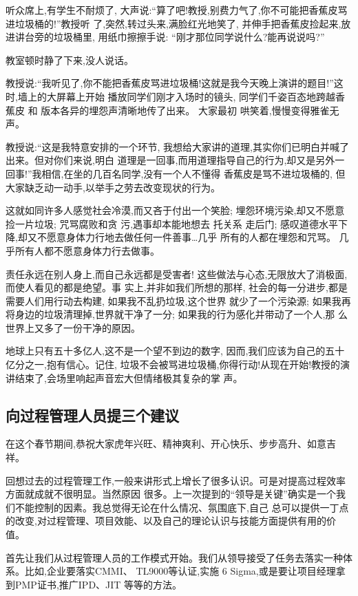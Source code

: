 \documentclass[11pt]{article}
\begin{document}
听众席上,有学生不耐烦了, 大声说:``算了吧!教授,别费力气了,你不可能把香蕉皮骂进垃圾桶的!''教授听
了,突然,转过头来,满脸红光地笑了, 并伸手把香蕉皮捡起来,放进讲台旁的垃圾桶里, 用纸巾擦擦手说:
``刚才那位同学说什么?能再说说吗?''
 
教室顿时静了下来,没人说话。
 
教授说:``我听见了,你不能把香蕉皮骂进垃圾桶!这就是我今天晚上演讲的题目!''这时,墙上的大屏幕上开始
播放同学们刚才入场时的镜头, 同学们千姿百态地跨越香蕉皮 和 版本各异的埋怨声清晰地传了出来。 大家最初
哄笑着,慢慢变得雅雀无声。
 
教授说:``这是我特意安排的一个环节, 我想给大家讲的道理,其实你们已明白并喊了出来。但对你们来说,明白
道理是一回事,而用道理指导自己的行为,却又是另外一回事!''我相信,在坐的几百名同学,没有一个人不懂得
香蕉皮是骂不进垃圾桶的, 但大家缺乏动一动手,以举手之劳去改变现状的行为。
 
这就如同许多人感觉社会冷漠,而又吝于付出一个笑脸; 埋怨环境污染,却又不愿意捡一片垃圾; 咒骂腐败和贪
污,遇事却本能地想去 托关系 走后门; 感叹道德水平下降,却又不愿意身体力行地去做任何一件善事\ldots  几乎
所有的人都在埋怨和咒骂。 几乎所有人都不愿意身体力行去做事。
 
责任永远在别人身上,而自己永远都是受害者! 这些做法与心态,无限放大了消极面,而使人看见的都是绝望。事
实上,并非如我们所想的那样, 社会的每一分进步,都是需要人们用行动去构建, 如果我不乱扔垃圾,这个世界
就少了一个污染源; 如果我再将身边的垃圾清理掉,世界就干净了一分; 如果我的行为感化并带动了一个人,那
么世界上又多了一份干净的原因。
 
地球上只有五十多亿人,这不是一个望不到边的数字, 因而,我们应该为自己的五十亿分之一,抱有信心。记住,
垃圾不会被骂进垃圾桶,你得行动!从现在开始!教授的演讲结束了,会场里响起声音宏大但情绪极其复杂的掌
声。

\subsection{向过程管理人员提三个建议}

在这个春节期间,恭祝大家虎年兴旺、精神爽利、开心快乐、步步高升、如意吉祥。

回想过去的过程管理工作,一般来讲形式上增长了很多认识。可是对提高过程效率方面就成就不很明显。当然原因
很多。上一次提到的``领导是关键''确实是一个我们不能控制的因素。我总觉得无论在什么情况、氛围底下,自己
总可以提供一丁点的改变,对过程管理、项目效能、以及自己的理论认识与技能方面提供有用的价值。

首先让我们从过程管理人员的工作模式开始。我们从领导接受了任务去落实一种体系。比如,企业要落实CMMI、
TL9000等认证,实施 6 Sigma,或是要让项目经理拿到PMP证书,推广IPD、JIT 等等的方法。
\end{document}
